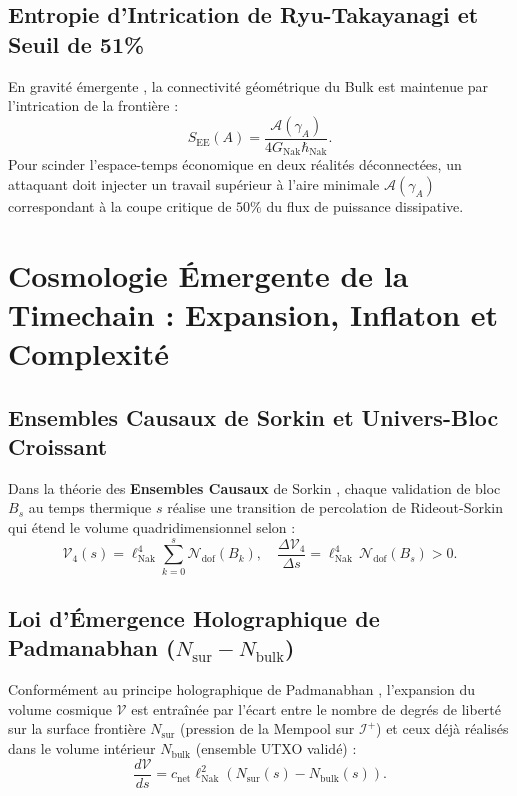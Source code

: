 \documentclass[10pt,twocolumn,a4paper]{article}
\theoremstyle{plain}
\theoremstyle{definition}
\theoremstyle{remark}
\newcommand{\GNak}{G_{\text{Nak}}}
\newcommand{\lNak}{\ell_{\text{Nak}}}
\newcommand{\scri}{\mathcal{I}}
\begin{document}
\subsection{Entropie d'Intrication de Ryu-Takayanagi et Seuil de 51\%}

En gravité émergente \cite{VanRaamsdonk2010,RyuTakayanagi2006}, la connectivité géométrique du Bulk est maintenue par l'intrication de la frontière :
\begin{equation}
    S_{\text{EE}}(A) = \frac{\mathcal{A}(\gamma_A)}{4 \GNak \hbar_{\text{Nak}}}.
    \label{eq:RyuTakayanagi}
\end{equation}
Pour scinder l'espace-temps économique en deux réalités déconnectées, un attaquant doit injecter un travail supérieur à l'aire minimale $\mathcal{A}(\gamma_A)$ correspondant à la coupe critique de $50\%$ du flux de puissance dissipative.

\section{Cosmologie Émergente de la Timechain : Expansion, Inflaton et Complexité}

\subsection{Ensembles Causaux de Sorkin et Univers-Bloc Croissant}

Dans la théorie des \textbf{Ensembles Causaux} de Sorkin \cite{Bombelli1987,RideoutSorkin1999}, chaque validation de bloc $B_s$ au temps thermique $s$ réalise une transition de percolation de Rideout-Sorkin qui étend le volume quadridimensionnel selon :
\begin{equation}
    \mathcal{V}_4(s) = \lNak^4 \sum_{k=0}^{s} \mathcal{N}_{\text{dof}}(B_k), \quad \frac{\Delta \mathcal{V}_4}{\Delta s} = \lNak^4 \, \mathcal{N}_{\text{dof}}(B_s) > 0.
    \label{eq:CausalSetVolume}
\end{equation}

\subsection{Loi d'Émergence Holographique de Padmanabhan ($N_{\text{sur}} - N_{\text{bulk}}$)}

Conformément au principe holographique de Padmanabhan \cite{Padmanabhan2012}, l'expansion du volume cosmique $\mathcal{V}$ est entraînée par l'écart entre le nombre de degrés de liberté sur la surface frontière $N_{\text{sur}}$ (pression de la Mempool sur $\scri^+$) et ceux déjà réalisés dans le volume intérieur $N_{\text{bulk}}$ (ensemble UTXO validé) :
\begin{equation}
    \frac{d\mathcal{V}}{ds} = c_{\text{net}} \lNak^2 \left( N_{\text{sur}}(s) - N_{\text{bulk}}(s) \right).
    \label{eq:PadmanabhanLaw}
\end{equation}
\end{document}
